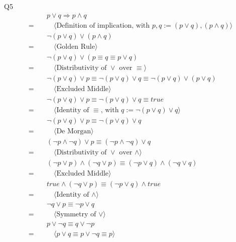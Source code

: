 \documentclass{article}
\begin{document}
    \vspace{10mm}
    Q5
    \begin{align*}
        & \quad p \vee q  \Longrightarrow p \land q \\
        = & \quad\quad \langle \text{Definition of implication, with } p,q := (p \vee q),(p \land q) \rangle \\
        & \quad \neg (p \vee q) \vee (p \land q) \\
        = & \quad\quad \langle \text{Golden Rule} \rangle \\
        & \quad \neg (p \vee q) \vee (p \equiv q \equiv p \vee q) \\
        = & \quad\quad \langle \text{Distributivity of } \vee \text{ over } \equiv \rangle \\
        & \quad \neg (p \vee q) \vee p \equiv \neg (p \vee q) \vee q \equiv \neg (p \vee q) \vee (p \vee q) \\
        = & \quad\quad \langle \text{Excluded Middle} \rangle \\
        & \quad \neg (p \vee q) \vee p \equiv \neg (p \vee q) \vee q \equiv true \\
        = & \quad\quad \langle \text{Identity of } \equiv \text{, with } q := \neg (p \vee q) \vee q \rangle \\
        & \quad \neg (p \vee q) \vee p \equiv \neg (p \vee q) \vee q \\
        = & \quad\quad \langle \text{De Morgan} \rangle \\
        & \quad (\neg p \land \neg q) \vee p \equiv (\neg p \land \neg q) \vee q \\
        = & \quad\quad \langle \text{Distributivity of } \vee \text{ over } \land \rangle \\
        & \quad (\neg p \vee p) \land (\neg q \vee p) \equiv (\neg p \vee q) \land (\neg q \vee q) \\
        = & \quad\quad \langle \text{Excluded Middle} \rangle \\ 
        & \quad true \land (\neg q \vee p) \equiv (\neg p \vee q) \land true \\
        = & \quad\quad \langle \text{Identity of } \land \rangle \\ 
        & \quad \neg q \vee p \equiv \neg p \vee q \\
        = & \quad\quad \langle \text{Symmetry of } \vee \rangle \\ 
        & \quad p \vee \neg q \equiv q \vee \neg p \\
        = & \quad\quad \langle p \vee q \equiv p \vee \neg q \equiv p \rangle \\ 

\end{align*}
\end{document}
